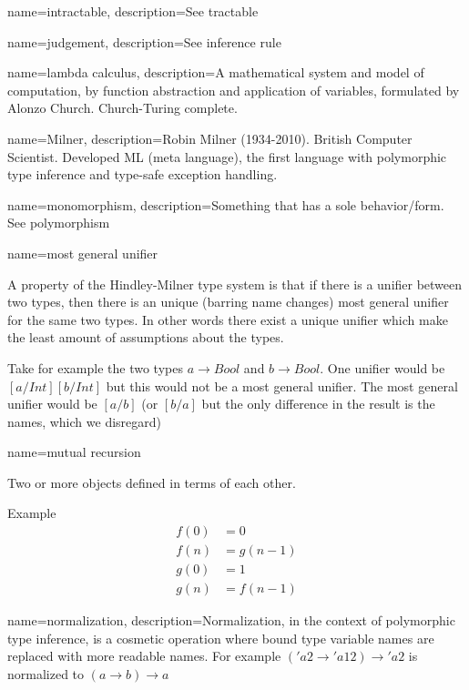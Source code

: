 { name={intractable},
  description={See tractable}
}

{ name={judgement},
  description={See inference rule}
}

{ name={lambda calculus},
  description={A mathematical system and model of computation, by function abstraction and application of variables, formulated by Alonzo Church. Church-Turing complete.}
} %

{ name={Milner},
  description={Robin Milner (1934-2010). British Computer Scientist. Developed ML (meta language), the first language with polymorphic type inference and type-safe exception handling.}
} %

{ name={monomorphism},
  description={Something that has a sole behavior/form. See polymorphism}
}

{ name={most general unifier} }
{A property of the Hindley-Milner type system is that if there is a unifier between two types, then there is an unique (barring name changes) most general unifier for the same two types. In other words there exist a unique unifier which make the least amount of assumptions about the types.

Take for example the two types $a \to Bool$ and $b \to Bool$. One unifier would be
$[a/Int][b/Int]$ but this would not be a most general unifier. The most general unifier would be $[a/b]$ (or $[b/a]$ but the only difference in the result is the names, which we disregard)}

{ name={mutual recursion} }
{Two or more objects defined in terms of each other.

Example
\begin{align*}
f(0) &= 0 \\
f(n) &= g(n-1) \\
g(0) &= 1 \\
g(n) &= f(n-1)
\end{align*}
}

{ name={normalization},
  description={Normalization, in the context of polymorphic type inference, is a cosmetic operation where bound type variable names are replaced with more readable names. For example $('a2 \to 'a12) \to 'a2$ is normalized to $(a \to b) \to a$}
}

